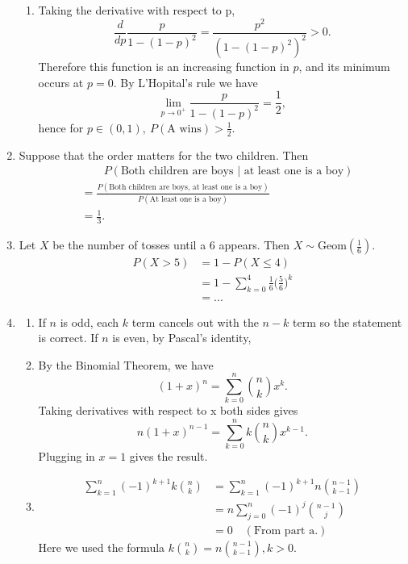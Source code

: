 \documentclass{article}
\begin{document}
\begin{enumerate}
\begin{enumerate}
        \item Taking the derivative with respect to p,
        \[ \frac{d}{dp} \frac{p}{1 - (1-p)^2} = \frac{p^2}{(1 - (1 - p)^2)^2} > 0. \]
        Therefore this function is an increasing function in $p$, and its minimum occurs at
        $p = 0$. By L'Hopital's rule we have
        \[ \lim_{p \to 0^+} \frac{p}{1 - (1 - p)^2} = \frac{1}{2}, \]
        hence for $p \in (0, 1), \ P(\text{A wins}) > \frac{1}{2}$.
    \end{enumerate}

    \item Suppose that the order matters for the two children. Then
    \begin{align*}
        &\qquad P(\text{Both children are boys | at least one is a boy}) \\
        &= \frac{P(\text{Both children are boys, at least one is a boy})}
        {P(\text{At least one is a boy})} \\
        &= \frac{1}{3}.
    \end{align*}

    \item Let $X$ be the number of tosses until a 6 appears. Then
    $X \sim \text{Geom}(\frac{1}{6})$.
    \begin{align*}
        P(X > 5)
        &= 1 - P(X \leq 4) \\
        &= 1 - \sum_{k = 0}^{4} \frac{1}{6} \Big( \frac{5}{6} \Big)^{k} \\
        &= ...
    \end{align*}

    \item \begin{enumerate}
        \item If $n$ is odd, each $k$ term cancels out with the $n - k$ term so the statement
        is correct. If $n$ is even, by Pascal's identity,

        \item By the Binomial Theorem, we have
        \[ (1 + x)^{n} = \sum_{k = 0}^{n} \binom{n}{k}x^{k}. \]
        Taking derivatives with respect to x both sides gives
        \[ n(1 + x)^{n - 1} = \sum_{k = 0}^{n} k \binom{n}{k}x^{k-1}.\]
        Plugging in $x = 1$ gives the result.

        \item \begin{align*}
            \sum_{k = 1}^{n} (-1)^{k + 1} k\binom{n}{k}
            &= \sum_{k = 1}^{n} (-1)^{k + 1} n\binom{n - 1}{k - 1} \\
            &= n\sum_{j = 0}^{n} (-1)^{j} \binom{n - 1}{j} \\
            &= 0 \quad (\text{From part a.})
        \end{align*}
        Here we used the formula $k\binom{n}{k} = n\binom{n - 1}{k - 1}, k > 0$.
    \end{enumerate}


\end{enumerate}
\end{document}
